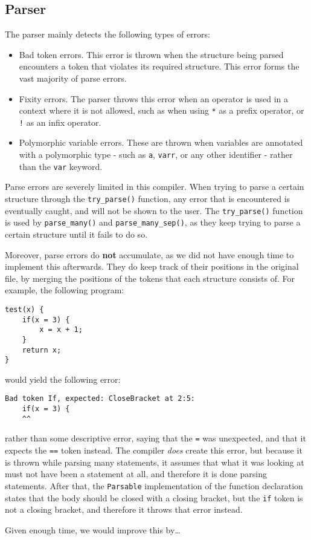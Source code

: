 \subsection{Parser}
The parser mainly detects the following types of errors:

\begin{itemize}
    \item Bad token errors. This error is thrown when the structure being parsed encounters a token that violates its required structure. This error forms the vast majority of parse errors.
    \item Fixity errors. The parser throws this error when an operator is used in a context where it is not allowed, such as when using \lstinline|*| as a prefix operator, or \lstinline|!| as an infix operator.
    \item Polymorphic variable errors. These are thrown when variables are annotated with a polymorphic type - such as \lstinline|a|, \lstinline|varr|, or any other identifier - rather than the \lstinline|var| keyword.
\end{itemize}

Parse errors are severely limited in this compiler. When trying to parse a certain structure through the \lstinline|try_parse()| function, any error that is encountered is eventually caught, and will not be shown to the user. The \lstinline|try_parse()| function is used by \lstinline|parse_many()| and \lstinline|parse_many_sep()|, as they keep trying to parse a certain structure until it fails to do so.

Moreover, parse errors do \textbf{not} accumulate, as we did not have enough time to implement this afterwards. They do keep track of their positions in the original file, by merging the positions of the tokens that each structure consists of. For example, the following program:

\begin{lstlisting}
test(x) {
    if(x = 3) {
        x = x + 1;
    }
    return x;
}
\end{lstlisting}

would yield the following error:

\begin{lstlisting}
Bad token If, expected: CloseBracket at 2:5:
    if(x = 3) {
    ^^
\end{lstlisting}

rather than some descriptive error, saying that the \lstinline|=| was unexpected, and that it expects the \lstinline|==| token instead. The compiler \textit{does} create this error, but because it is thrown while parsing many statements, it assumes that what it was looking at must not have been a statement at all, and therefore it is done parsing statements. After that, the \lstinline|Parsable| implementation of the function declaration states that the body should be closed with a closing bracket, but the \lstinline|if| token is not a closing bracket, and therefore it throws that error instead.

Given enough time, we would improve this by\dots{}
